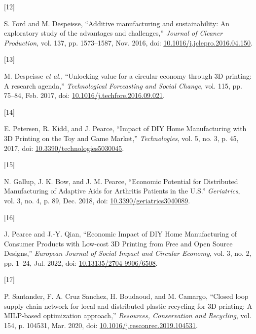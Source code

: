 \documentclass[
]{article}
\newlength{\cslhangindent}
\newlength{\csllabelwidth}
\newlength{\cslentryspacingunit} %
\newenvironment{CSLReferences}[2] %
 {%
  \setlength{\parindent}{0pt}
  \ifodd #1
  \let\oldpar\par
  \def\par{\hangindent=\cslhangindent\oldpar}
  \fi
  \setlength{\parskip}{#2\cslentryspacingunit}
 }%
 {}
\newcommand{\CSLLeftMargin}[1]{\parbox[t]{\csllabelwidth}{#1}}
\newcommand{\CSLRightInline}[1]{\parbox[t]{\linewidth - \csllabelwidth}{#1}\break}
\begin{document}
\begin{CSLReferences}{0}{0}
\leavevmode{}%
\CSLLeftMargin{{[}12{]} }%
\CSLRightInline{S. Ford and M. Despeisse, {``Additive manufacturing and
sustainability: An exploratory study of the advantages and
challenges,''} \emph{Journal of Cleaner Production}, vol. 137, pp.
1573--1587, Nov. 2016, doi:
\href{https://doi.org/10.1016/j.jclepro.2016.04.150}{10.1016/j.jclepro.2016.04.150}.}

\leavevmode{}%
\CSLLeftMargin{{[}13{]} }%
\CSLRightInline{M. Despeisse \emph{et al.}, {``Unlocking value for a
circular economy through {3D} printing: {A} research agenda,''}
\emph{Technological Forecasting and Social Change}, vol. 115, pp.
75--84, Feb. 2017, doi:
\href{https://doi.org/10.1016/j.techfore.2016.09.021}{10.1016/j.techfore.2016.09.021}.}

\leavevmode{}%
\CSLLeftMargin{{[}14{]} }%
\CSLRightInline{E. Petersen, R. Kidd, and J. Pearce, {``Impact of {DIY
Home Manufacturing} with {3D Printing} on the {Toy} and {Game
Market},''} \emph{Technologies}, vol. 5, no. 3, p. 45, 2017, doi:
\href{https://doi.org/10.3390/technologies5030045}{10.3390/technologies5030045}.}

\leavevmode{}%
\CSLLeftMargin{{[}15{]} }%
\CSLRightInline{N. Gallup, J. K. Bow, and J. M. Pearce, {``Economic
{Potential} for {Distributed Manufacturing} of {Adaptive Aids} for
{Arthritis Patients} in the {U}.{S}.''} \emph{Geriatrics}, vol. 3, no.
4, p. 89, Dec. 2018, doi:
\href{https://doi.org/10.3390/geriatrics3040089}{10.3390/geriatrics3040089}.}

\leavevmode{}%
\CSLLeftMargin{{[}16{]} }%
\CSLRightInline{J. Pearce and J.-Y. Qian, {``Economic {Impact} of {DIY
Home Manufacturing} of {Consumer Products} with {Low-cost 3D Printing}
from {Free} and {Open Source Designs},''} \emph{European Journal of
Social Impact and Circular Economy}, vol. 3, no. 2, pp. 1--24, Jul.
2022, doi:
\href{https://doi.org/10.13135/2704-9906/6508}{10.13135/2704-9906/6508}.}

\leavevmode{}%
\CSLLeftMargin{{[}17{]} }%
\CSLRightInline{P. Santander, F. A. Cruz Sanchez, H. Boudaoud, and M.
Camargo, {``Closed loop supply chain network for local and distributed
plastic recycling for {3D} printing: A {MILP-based} optimization
approach,''} \emph{Resources, Conservation and Recycling}, vol. 154, p.
104531, Mar. 2020, doi:
\href{https://doi.org/10.1016/j.resconrec.2019.104531}{10.1016/j.resconrec.2019.104531}.}


\end{CSLReferences}
\end{document}
